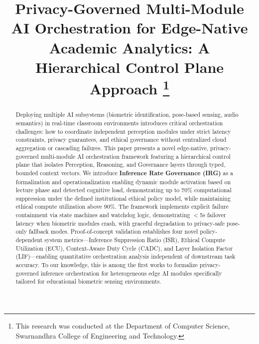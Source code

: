 \documentclass[conference]{IEEEtran}
\begin{document}
\title{Privacy-Governed Multi-Module AI Orchestration for Edge-Native Academic Analytics: A Hierarchical Control Plane Approach
\thanks{This research was conducted at the Department of Computer Science, Swarnandhra College of Engineering and Technology.}
}

\author{
}

\maketitle

\begin{abstract}
Deploying multiple AI subsystems (biometric identification, pose-based sensing, audio semantics) in real-time classroom environments introduces critical orchestration challenges: how to coordinate independent perception modules under strict latency constraints, privacy guarantees, and ethical governance without centralized cloud aggregation or cascading failures. This paper presents a novel edge-native, privacy-governed multi-module AI orchestration framework featuring a hierarchical control plane that isolates Perception, Reasoning, and Governance layers through typed, bounded context vectors. We introduce \textbf{Inference Rate Governance (IRG)} as a formalization and operationalization enabling dynamic module activation based on lecture phase and detected cognitive load, demonstrating up to 70\% computational suppression under the defined institutional ethical policy model, while maintaining ethical compute utilization above 90\%. The framework implements explicit failure containment via state machines and watchdog logic, demonstrating $<$5s failover latency when biometric modules crash, with graceful degradation to privacy-safe pose-only fallback modes. Proof-of-concept validation establishes four novel policy-dependent system metrics---Inference Suppression Ratio (ISR), Ethical Compute Utilization (ECU), Context-Aware Duty Cycle (CADC), and Layer Isolation Factor (LIF)---enabling quantitative orchestration analysis independent of downstream task accuracy. To our knowledge, this is among the first works to formalize privacy-governed inference orchestration for heterogeneous edge AI modules specifically tailored for educational biometric sensing environments.
\end{abstract}
\end{document}
